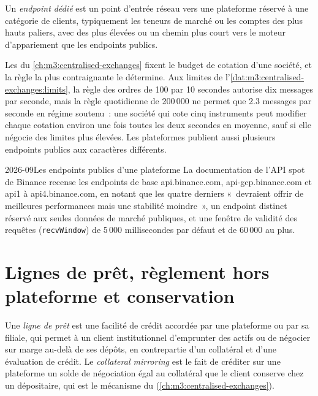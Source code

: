 \begin{definition}\label{def:m3:getting-access-crypto-venues:endpoint}
Un \emph{endpoint dédié} est un point d'entrée réseau vers une plateforme réservé à une catégorie de clients, typiquement les teneurs de marché ou
les comptes des plus hauts paliers, avec des  plus élevées ou un chemin plus court vers le moteur d'appariement que les endpoints publics.
\end{definition}

Les  du \cref{ch:m3:centralised-exchanges} fixent le budget de cotation d'une société, et la règle la plus contraignante le détermine. Aux limites
de l'\cref{dat:m3:centralised-exchanges:limits}, la règle des ordres de 100 par 10 secondes autorise dix messages par seconde, mais la règle quotidienne de 200\,000 ne permet
que 2.3 messages par seconde en régime soutenu~: une société qui cote cinq instruments peut modifier chaque cotation environ une fois toutes les deux secondes en moyenne, sauf si elle négocie des limites plus élevées.
Les plateformes publient aussi plusieurs endpoints publics aux caractères différents.

\begin{dated}{2026-09}{Les endpoints publics d'une plateforme}\label{dat:m3:getting-access-crypto-venues:endpoints}
La documentation de l'API spot de Binance recense les endpoints de base api.binance.com, api-gcp.binance.com et api1 à api4.binance.com, en notant que les quatre derniers
«~devraient offrir de meilleures performances mais une stabilité moindre~», un endpoint distinct réservé aux seules données de marché publiques, et une fenêtre de validité des requêtes
(\texttt{recvWindow}) de 5\,000 millisecondes par défaut et de 60\,000 au plus.
\end{dated}

\section{Lignes de prêt, règlement hors plateforme et conservation}

\begin{definition}\label{def:m3:getting-access-crypto-venues:loan}
Une \emph{ligne de prêt} est une facilité de crédit accordée par une plateforme ou par sa filiale, qui permet à un client institutionnel d'emprunter des actifs ou de négocier sur marge
au-delà de ses dépôts, en contrepartie d'un collatéral et d'une évaluation de crédit. Le \emph{collateral mirroring} est le fait de créditer sur une plateforme un solde de négociation
égal au collatéral que le client conserve chez un dépositaire, qui est le mécanisme du 
(\cref{ch:m3:centralised-exchanges}).
\end{definition}

